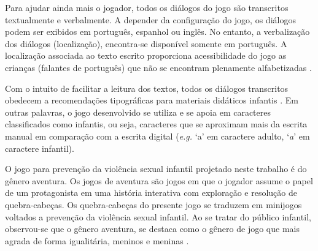 
Para ajudar ainda mais o jogador, todos os diálogos do jogo são transcritos textualmente e verbalmente. A depender da configuração do jogo, os diálogos podem ser exibidos em português, espanhol ou inglês. No entanto, a verbalização dos diálogos (localização), encontra-se disponível somente em português. A localização associada ao texto escrito proporciona acessibilidade do jogo as crianças (falantes de português) que não se encontram plenamente alfabetizadas \cite{limeira2015avaliaccao}. 

Com o intuito de facilitar a leitura dos textos, todos os diálogos transcritos obedecem a recomendações tipográficas para materiais didáticos infantis \cite{lourenco2011tipografia}. Em outras palavras, o jogo desenvolvido se utiliza e se apoia em caracteres classificados como infantis, ou seja, caracteres que se aproximam mais da escrita manual em comparação com a escrita digital (\textit{e.g.} `a' em caractere adulto, `\textit{a}' em caractere infantil).

O jogo para prevenção da violência sexual infantil projetado neste trabalho é do gênero aventura. Os jogos de aventura são jogos em que o jogador assume o papel de um protagonista em uma história interativa com exploração e resolução de quebra-cabeças. Os quebra-cabeças do presente jogo se traduzem em minijogos voltados a prevenção da violência sexual infantil. Ao se tratar do público infantil, observou-se que o gênero aventura, se destaca como o gênero de jogo que mais agrada de forma igualitária, meninos e meninas \cite{brandtzaeg2009children}. 

